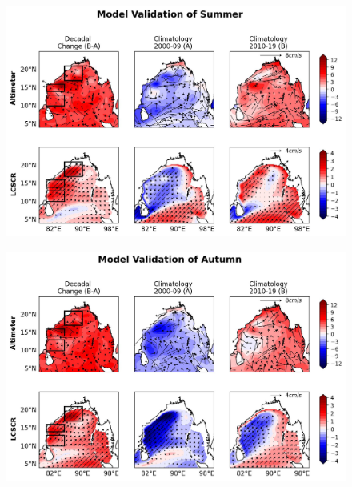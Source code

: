 \documentclass[review]{elsarticle}
\begin{document}
\begin{figure}[!h]
	\begin{center}
		\includegraphics[width=1\textwidth]{./images/Summer_Mod_val.jpg}
		\caption {
		}
		\label{fig:paper_05}
	\end{center}
\end{figure}
\clearpage

\begin{figure}[!h]
	\begin{center}
		\includegraphics[width=1\textwidth]{./images/Autumn_Mod_val.jpg}
		\caption {
		}
		\label{fig:paper_06}
	\end{center}
\end{figure}
\clearpage
\end{document}
